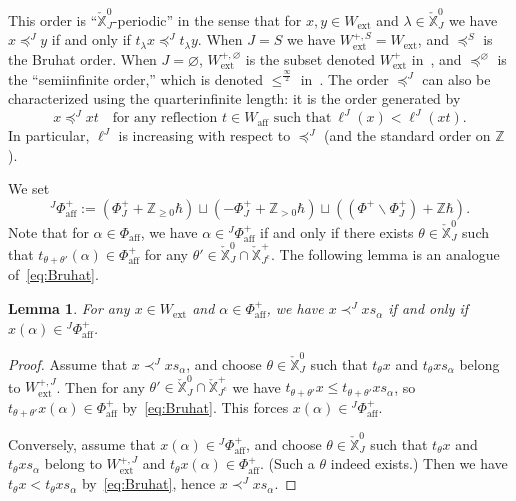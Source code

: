 \documentclass[11pt]{amsart}
\numberwithin{equation}{section}
\theoremstyle{plain}
\newtheorem{lem}[thm]{Lemma}
\theoremstyle{definition}
\newcommand{\X}{{\mathbb X}}
\newcommand{\Xd}{\check{\X}}
\newcommand{\Z}{{\mathbb Z}}
\newcommand{\semi}{{{\frac{\infty}{2}}}}
\newcommand{\ex}{\mathrm{ext}}
\newcommand{\af}{\mathrm{aff}}
\newcommand{\comp}{\mathrm{c}}
\begin{document}
This order is ``$\Xd^0_J$-periodic'' in the sense that for $x,y \in W_\ex$ and $\lambda \in \Xd^0_J$ we have $x \preceq^J y$ if and only if $t_\lambda x \preceq^J t_\lambda y$.
When $J=S$ we have $W_\ex^{+,S} = W_\ex$, and $\preceq^S$ is the Bruhat order. When $J=\varnothing$, $W_\ex^{+,\varnothing}$ is the subset denoted $W_\ex^+$ in~\cite[\S 3.1]{adr}, and $\preceq^{\varnothing}$ is the ``semiinfinite order,'' which is denoted $\leq^\semi$ in~\cite{adr}.
The order $\preceq^{J}$ can also be characterized using the quarterinfinite length: it is the order generated by 
\[
x \preceq^{J} xt \quad \text{for any reflection $t\in W_\af$ such that}\ \ell^J(x)<\ell^J(xt). 
\]
In particular, $\ell^J$ is increasing with respect to $\preceq^J$ (and the standard order on $\Z$).

We set 
\[
{}^J\Phi^+_\af:= (\Phi_J^++\Z_{\geq 0}\hbar) \sqcup (-\Phi_J^++\Z_{> 0}\hbar) \sqcup ((\Phi^+\smallsetminus \Phi_J^+) +\Z \hbar). 
\]
Note that for $\alpha \in \Phi_\af$, we have $\alpha \in {}^J\Phi^+_\af$ if and only if there exists $\theta \in \Xd_J^0$ such that $t_{\theta+\theta'} (\alpha) \in \Phi_\af^+$ for any $\theta' \in \Xd_J^0 \cap \Xd_{J^\comp}^+$.
The following lemma is an analogue of~\eqref{eq:Bruhat}.

\begin{lem}
\label{lem:quar-order}
For any $x\in W_\ex$ and $\alpha\in \Phi^+_\af$, we have $x\prec^{J} xs_\alpha$ if and only if $x(\alpha)\in {}^J\Phi_\af^+$. 
\end{lem}

\begin{proof}
Assume that $x\prec^{J} xs_\alpha$, and choose $\theta \in \Xd_J^0$ such that $t_\theta x$ and $t_\theta x s_\alpha$ belong to $W_\ex^{+,J}$. Then for any $\theta' \in \Xd_J^0 \cap \Xd_{J^\comp}^+$ we have  $t_{\theta+\theta'} x \leq t_{\theta + \theta'} x s_\alpha$, so $t_{\theta+\theta'} x(\alpha) \in \Phi_\af^+$ by~\eqref{eq:Bruhat}. This forces $x(\alpha)\in {}^J\Phi_\af^+$.

Conversely, assume that $x(\alpha)\in {}^J\Phi_\af^+$, and choose $\theta \in \Xd^0_J$ such that $t_\theta x$ and $t_\theta x s_\alpha$ belong to $W_\ex^{+,J}$ and $t_{\theta} x(\alpha) \in \Phi_\af^+$. (Such a $\theta$ indeed exists.) Then we have $t_{\theta} x < t_{\theta} x s_\alpha$ by~\eqref{eq:Bruhat}, hence $x\prec^{J} xs_\alpha$.
\end{proof}
\end{document}
